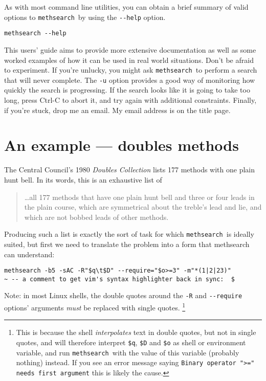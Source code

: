 \documentclass[a4paper,11pt,oneside]{book}
\makeatletter
\newcommand{\loi}[1]{\index{#1@{\hspace*{-\loptwidth}\texttt{--#1}}}}
\def\methsearch{\texttt{meth\-search}}
\makeatother
\begin{document}
As with most command line utilities, you can obtain a brief summary 
of valid options to \methsearch\ by using the \verb+--help+ option.%

\begin{Verbatim}
methsearch --help
\end{Verbatim}
\loi{help}

This users' guide aims to provide more extensive documentation as 
well as some worked examples of how it can be used in real world situations.
Don't be afraid to experiment.  If you're unlucky, you might
ask \methsearch\ to perform a search that will never complete.  
The \verb+-u+ option provides a good way of monitoring how quickly 
the search is progressing.  If the search looks like it is going to take
too long, press Ctrl-C to abort it, and try again with additional constraints.
Finally, if you're stuck, drop me an email.  
My email address is on the title page.

\section{An example — doubles methods}\label{eg_doubles}

The Central Council's 1980 \textit{Doubles Collection}%
lists 177 methods with one plain hunt bell.  
In its words, this is an exhaustive list of 
\begin{quote}
\ldots all 177 methods that have one plain hunt bell and three or four leads in
the plain course, which are symmetrical about the treble's lead and lie,
and which are not bobbed leads of other methods.
\end{quote}
Producing such a list is exactly the sort of task for which 
\methsearch\ is ideally suited, but first we need to translate the problem
into a form that methsearch can understand:

\begin{Verbatim}[commentchar=~]
methsearch -b5 -sAC -R"$q\t$D" --require="$o>=3" -m"*(1|2|23)"
~ -- a comment to get vim's syntax highlighter back in sync:  $
\end{Verbatim}

Note: in most Linux shells, 
the double quotes around the \verb+-R+ and \verb+--require+ options' arguments 
\textit{must} be replaced with single quotes.%
\footnote{This is because the shell 
\textit{interpolates} text in double quotes,
but not in single quotes,  and will therefore interpret 
\verb+$q+, \verb+$D+ and \verb+$o+ as shell or environment variable, and 
run \methsearch\ with the value of this variable (probably nothing) instead.
If you see an error message saying 
\texttt{Binary operator ">=" needs first argument}
this is likely the cause.}
\end{document}
